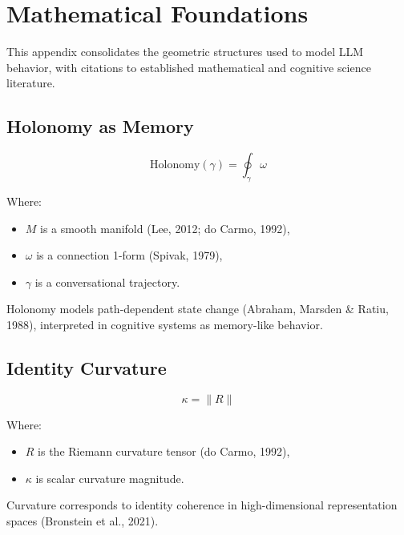 
\section*{Mathematical Foundations}

This appendix consolidates the geometric structures used to model
LLM behavior, with citations to established mathematical and cognitive
science literature.


\subsection*{Holonomy as Memory}
\[
\mathrm{Holonomy}(\gamma) = \oint_{\gamma} \omega
\]

Where:
\begin{itemize}[noitemsep]
    \item $M$ is a smooth manifold (Lee, 2012; do Carmo, 1992),
    \item $\omega$ is a connection 1-form (Spivak, 1979),
    \item $\gamma$ is a conversational trajectory.
\end{itemize}

Holonomy models path-dependent state change (Abraham, Marsden \& Ratiu, 1988),
interpreted in cognitive systems as memory-like behavior.


\subsection*{Identity Curvature}
\[
\kappa = \| R \|
\]

Where:
\begin{itemize}[noitemsep]
    \item $R$ is the Riemann curvature tensor (do Carmo, 1992),
    \item $\kappa$ is scalar curvature magnitude.
\end{itemize}

Curvature corresponds to identity coherence in high-dimensional
representation spaces (Bronstein et al., 2021).

